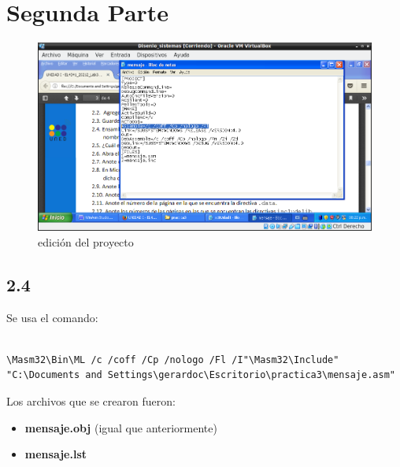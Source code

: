 \section{Segunda Parte}

\begin{figure}[H]
  \includegraphics[width=\linewidth]{practica3/imagenes/actividad2/edicion_proyecto.png}
  \caption{edición del proyecto}
\end{figure}

\subsection*{2.4}
Se usa el comando:

\begin{BVerbatim}

\Masm32\Bin\ML /c /coff /Cp /nologo /Fl /I"\Masm32\Include"
"C:\Documents and Settings\gerardoc\Escritorio\practica3\mensaje.asm"

\end{BVerbatim}

Los archivos que se crearon fueron:

\begin{itemize}
    \item \textbf{mensaje.obj} (igual que anteriormente)
    \item \textbf{mensaje.lst}
\end{itemize}

